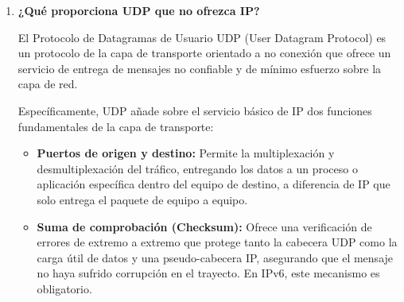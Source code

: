 \documentclass[11pt,a4paper]{article}
\begin{document}
\begin{enumerate}[label=20.\arabic*, start=1, itemsep=0.3cm]
\begin{itemize}
    \item \textbf{Ventana de congestión (\(CWND\))}: limita la cantidad de datos que pueden encontrarse en tránsito. La cantidad efectiva de datos enviados está limitada por el mínimo entre \(CWND\) y la ventana anunciada por el receptor (\(RWIN\)).
    \item \textbf{Arranque lento (Slow Start)}: al comenzar una conexión o después de una congestión importante, TCP inicia con una ventana pequeña y aumenta rápidamente \(CWND\), buscando determinar progresivamente la capacidad disponible de la red.
    \item \textbf{Evitación de congestión (Congestion Avoidance)}: cuando \(CWND\) alcanza el umbral \(ssthresh\), su crecimiento se vuelve más lento y aproximadamente lineal, evitando sobrecargar la red.
    \item \textbf{Retransmisión rápida y recuperación rápida (Fast Retransmit / Fast Recovery)}: cuando TCP recibe varios ACKs duplicados, interpreta que probablemente se perdió un segmento. Lo retransmite sin esperar a que expire el temporizador y reduce la ventana de congestión para disminuir la carga sobre la red.
    \item \textbf{Temporizador de retransmisión (RTO)}: TCP adapta el tiempo de espera para las retransmisiones en función de las estimaciones del RTT. Si aumenta el retardo de la red, el RTO se ajusta para evitar retransmisiones prematuras que podrían aumentar aún más la congestión.
\end{itemize}

En conjunto, estos mecanismos permiten que TCP \textbf{adapte dinámicamente la velocidad de transmisión a las condiciones de la red}, reduciendo el tráfico cuando detecta congestión y aumentando progresivamente la transmisión cuando la red parece tener capacidad disponible.

  \item
    \textbf{¿Qué proporciona UDP que no ofrezca IP?}

    El Protocolo de Datagramas de Usuario UDP (User Datagram Protocol) es un protocolo de la capa de transporte orientado a no conexión que ofrece un servicio de entrega de mensajes no confiable y de mínimo esfuerzo sobre la capa de red.

    Específicamente, UDP añade sobre el servicio básico de IP dos funciones fundamentales de la capa de transporte:
\begin{itemize}
     \item \textbf {Puertos de origen y destino:} Permite la multiplexación y desmultiplexación del tráfico, entregando los datos a un proceso o aplicación específica dentro del equipo de destino, a diferencia de IP que solo entrega el paquete de equipo a equipo.
     \item \textbf {Suma de comprobación (Checksum):} Ofrece una verificación de errores de extremo a extremo que protege tanto la cabecera UDP como la carga útil de datos y una pseudo-cabecera IP, asegurando que el mensaje no haya sufrido corrupción en el trayecto. En IPv6, este mecanismo es obligatorio.
\end{itemize}


\end{enumerate}
\end{document}
